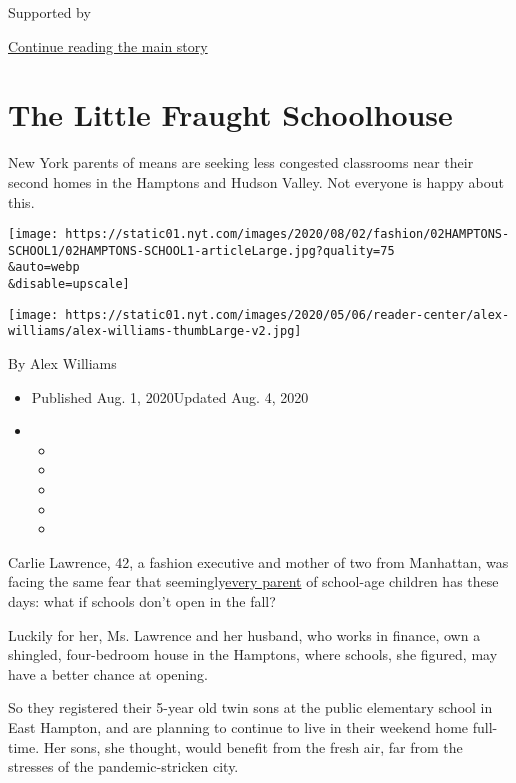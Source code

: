Supported by

\protect\hyperlink{after-sponsor}{Continue reading the main story}

\hypertarget{the-little-fraught-schoolhouse}{%
\section{The Little Fraught
Schoolhouse}\label{the-little-fraught-schoolhouse}}

New York parents of means are seeking less congested classrooms near
their second homes in the Hamptons and Hudson Valley. Not everyone is
happy about this.

\texttt{[image: https://static01.nyt.com/images/2020/08/02/fashion/02HAMPTONS-SCHOOL1/02HAMPTONS-SCHOOL1-articleLarge.jpg?quality=75\\\&auto=webp\\\&disable=upscale]}

\texttt{[image: https://static01.nyt.com/images/2020/05/06/reader-center/alex-williams/alex-williams-thumbLarge-v2.jpg]}

By Alex Williams

\begin{itemize}
\item
  Published Aug. 1, 2020Updated Aug. 4, 2020
\item
  \begin{itemize}
  \item
  \item
  \item
  \item
  \item
  \end{itemize}
\end{itemize}

Carlie Lawrence, 42, a fashion executive and mother of two from
Manhattan, was facing the same fear that
seemingly\href{https://www.nytimes.com/2020/07/30/nyregion/pod-schools-hastings-on-hudson.html}{every
parent} of school-age children has these days: what if schools don't
open in the fall?

Luckily for her, Ms. Lawrence and her husband, who works in finance, own
a shingled, four-bedroom house in the Hamptons, where schools, she
figured, may have a better chance at opening.

So they registered their 5-year old twin sons at the public elementary
school in East Hampton, and are planning to continue to live in their
weekend home full-time. Her sons, she thought, would benefit from the
fresh air, far from the stresses of the pandemic-stricken city.

